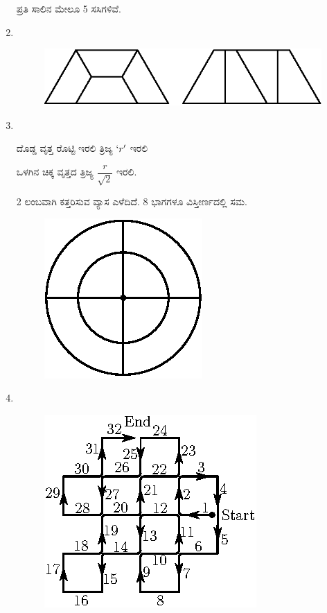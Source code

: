 \begin{enumerate}
\begin{minipage}[c]{5cm}
ಪ್ರತಿ ಸಾಲಿನ ಮೇಲೂ 5 ಸಸಿಗಳಿವೆ. 
\end{minipage}

\item 
~

\begin{figure}[H]
\centering
\includegraphics[scale=1.3]{images/chap9/ans21.eps}
\end{figure}

\eject

\item 
~

\begin{minipage}[c]{5cm}
ದೊಡ್ಡ ವೃತ್ತ ರೊಟ್ಟಿ ಇರಲಿ ತ್ರಿಜ್ಯ $`r'$ ಇರಲಿ 

ಒಳಗಿನ ಚಿಕ್ಕ ವೃತ್ತದ ತ್ರಿಜ್ಯ $\dfrac{r}{\sqrt{2}}$ ಇರಲಿ. 

2 ಲಂಬವಾಗಿ ಕತ್ತರಿಸುವ ವ್ಯಾಸ ಎಳೆದಿದೆ. 8 ಭಾಗಗಳೂ ವಿಸ್ತೀರ್ಣದಲ್ಲಿ ಸಮ. 
\end{minipage}
\begin{minipage}[c]{4cm}
\begin{figure}[H]
\centering
\includegraphics[scale=1.1]{images/chap9/ans22.eps}
\end{figure}
\end{minipage}

\item 
~

\begin{figure}[H]
\centering
\includegraphics{images/chap9/ans23.eps}
\end{figure}


\end{enumerate}
